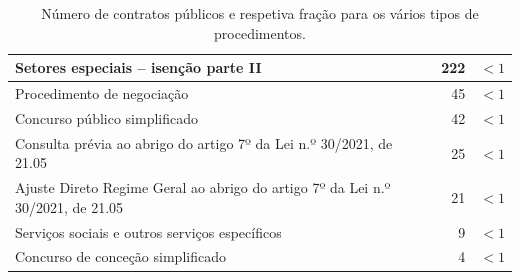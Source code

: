 \begin{table}[H]
{\begin{tabular}{lrr}
			Setores especiais – isenção parte II                                           & 222                                                                      & $< 1$                                                          \\ \hline
			\rowcolor[HTML]{EFEFEF} 
			Procedimento de negociação                                                     & 45                                                                       & $< 1$                                                          \\ \hline
			Concurso público simplificado                                                  & 42                                                                       & $< 1$                                                          \\ \hline
			\rowcolor[HTML]{EFEFEF} 
			Consulta prévia ao abrigo do artigo 7º da Lei n.º 30/2021, de 21.05            & 25                                                                       & $< 1$                                                          \\ \hline
			Ajuste Direto Regime Geral ao abrigo do artigo 7º da Lei n.º 30/2021, de 21.05 & 21                                                                       & $< 1$                                                          \\ \hline
			\rowcolor[HTML]{EFEFEF} 
			Serviços sociais e outros serviços específicos                                 & 9                                                                        & $< 1$                                                          \\ \hline
			Concurso de conceção simplificado                                              & 4                                                                        & $< 1$                                                          \\ \hline
		\end{tabular}%
	}
	\caption{Número de contratos públicos e respetiva fração para os vários tipos de procedimentos.}
	\label{tab:contratos}	
\end{table}






